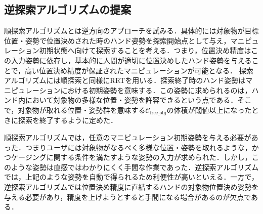 \documentclass[a4paper,papersize,dvipdfmx]{mtabst}
\begin{document}
\subsection{逆探索アルゴリズムの提案}
順探索アルゴリズムとは逆方向のアプローチを試みる．具体的には対象物が目標位置・姿勢で位置決めされた時のハンド姿勢を探索開始点として与え，マニピュレーション初期状態へ向けて探索することを考える．つまり，位置決め精度はこの入力姿勢に依存し，基本的に人間が適切に位置決めしたハンド姿勢を与えることで，高い位置決め精度が保証されたマニピュレーションが可能となる．
探索アルゴリズムには順探索と同様にRRTを用いる．探索終了時のハンド姿勢はマニピュレーションにおける初期姿勢を意味する．この姿勢に求められるのは，ハンド内において対象物の多様な位置・姿勢を許容できるという点である．そこで，対象物が取れる位置・姿勢群を意味する$\mathcal{C}_{\mathrm {free\_obj}}$の体積が閾値以上になったときに探索を終了するように定めた．\par
順探索アルゴリズムでは，任意のマニピュレーション初期姿勢を与える必要があった．つまりユーザには対象物がなるべく多様な位置・姿勢を取れるような，かつケージングに関する条件を満たすような姿勢の入力が求められた．しかし，このような姿勢は直感ではわかりにくく手間な作業であった．逆探索アルゴリズムでは，上記のような姿勢を自動で得られるため利便性が高いといえる．一方で，逆探索アルゴリズムでは位置決め精度に直結するハンドの対象物位置決め姿勢を与える必要があり，精度を上げようとすると手間になる場合があるのが欠点である．
\end{document}
